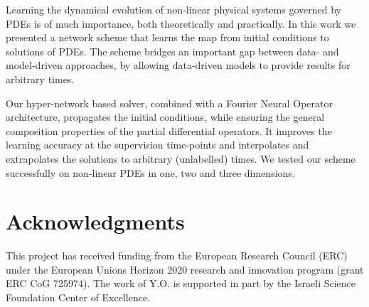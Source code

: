 \documentclass{article}
\theoremstyle{plain}
\theoremstyle{definition}
\theoremstyle{remark}
\begin{document}
Learning the dynamical evolution of non-linear physical systems governed by PDEs
is of much importance, both theoretically and practically. In this work we presented a network scheme that learns the map from initial conditions to solutions of PDEs. The scheme bridges an important gap between data- and model-driven approaches, by allowing data-driven models to provide results for arbitrary times.

Our hyper-network based solver, combined with a Fourier Neural Operator architecture, 
 propagates the initial conditions, while ensuring the general composition properties of the partial differential operators. It improves the learning accuracy at the supervision time-points and interpolates and extrapolates the solutions to arbitrary (unlabelled) times. We tested our scheme successfully on non-linear PDEs in one, two and three dimensions.


\section*{Acknowledgments}
This project has received funding from the European Research Council (ERC) under the European Unions Horizon 2020 research and innovation program (grant ERC CoG 725974). The work of Y.O. is supported in part by the Israeli Science Foundation Center of Excellence. 




\end{document}
